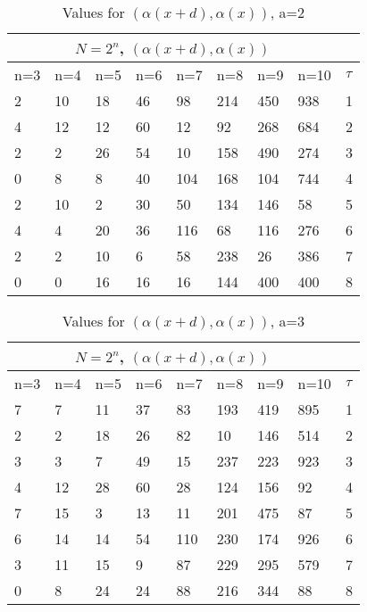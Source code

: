 \documentclass[20 pts]{article}
\begin{document}
\begin{table}[h!]
\centering
\begin{tabular}{ |p{0.7cm}|p{0.7cm}|p{0.7cm}|p{0.7cm}|p{0.7cm}|p{0.7cm}|p{0.7cm} |p{0.7cm}||p{0.7cm} |}
 \hline
 \multicolumn{8}{|c|}{$N=2^n$, $(\alpha(x+d),\alpha(x))$} \\
 \hline
n=3&n=4&n=5&n=6&n=7&n=8&n=9&n=10&$\tau$\\
 \hline
   2  &  10 &   18 &   46  &  98 &  214 &  450&   938 &    1\\
   4   & 12  &  12  &  60  &  12  &  92 &  268 &  684  &   2\\
   2   &  2   & 26   & 54   & 10  & 158 &  490 &  274  &   3\\
   0   &  8  &   8  &  40 &  104  & 168 &  104 &  744  &   4\\
   2   & 10 &    2  &  30  &  50  & 134  & 146  &  58  &   5\\
  4    & 4   & 20  &  36  & 116  &  68 &  116  & 276  &   6\\
  2    & 2   & 10   &  6  &  58  & 238  &  26  & 386   &  7\\
  0   &  0   & 16  &  16  &  16  & 144  & 400 &  400  &   8\\

 \hline
\end{tabular}
\caption{Values for $(\alpha(x+d),\alpha(x))$, a=2}
\label{table:2}
\end{table}

\begin{table}[h!]
\centering
\begin{tabular}{ |p{0.7cm}|p{0.7cm}|p{0.7cm}|p{0.7cm}|p{0.7cm}|p{0.7cm}|p{0.7cm} |p{0.7cm}||p{0.7cm} |}
 \hline
 \multicolumn{8}{|c|}{$N=2^n$, $(\alpha(x+d),\alpha(x))$} \\
 \hline
n=3&n=4&n=5&n=6&n=7&n=8&n=9&n=10&$\tau$\\
 \hline
   7  &   7   & 11   & 37   & 83  & 193   &419  & 895  &   1\\
   2  &   2  &  18   & 26   & 82  &  10 &  146 &  514  &   2\\
   3 &    3  &   7  &  49  &  15 &  237 &  223 &  923 &    3\\
   4  &  12  &  28 &   60 &   28&   124 &  156 &   92  &   4\\
   7  &  15 &    3 &   13  &  11 &  201 &  475 &   87  &   5\\
   6   & 14   & 14  &  54 &  110 &  230 &  174 &  926 &    6\\
   3  &  11   & 15  &   9  &  87  & 229  & 295 &  579   &  7\\
  0   &  8   & 24   & 24   & 88  & 216 &  344 &   88  &   8\\

 \hline
\end{tabular}
\caption{Values for $(\alpha(x+d),\alpha(x))$, a=3}
\label{table:3}
\end{table}
\end{document}
